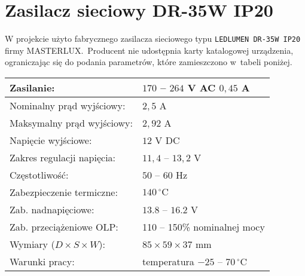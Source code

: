 \chapter{Zasilacz sieciowy DR-35W IP20}

W projekcie użyto fabrycznego zasilacza sieciowego typu \texttt{LEDLUMEN DR-35W IP20} firmy MASTERLUX.~Producent nie udostępnia karty katalogowej urządzenia, ograniczając się do podania parametrów, które zamieszczono w~tabeli poniżej.

\vspace{1cm}

\begin{centering}

\begin{tabular}{|l|l|}
  \hline
  Zasilanie: & $170$ -- $264$ V AC $0,45$ A \\
  \hline 
  Nominalny prąd wyjściowy: & $2,5$ A\\
  \hline
  Maksymalny prąd wyjściowy: & $2,92$ A \\
  \hline 
  Napięcie wyjściowe: & $12$ V DC  \\
  \hline
  Zakres regulacji napięcia: & $11,4$ -- $13,2$ V \\
  \hline
  Częstotliwość: & $50$ -- $60$ Hz \\
  \hline
  Zabezpieczenie termiczne: & $140\,^{\circ}\mathrm{C}$  \\
  \hline
  Zab. nadnapięciowe: & $13.8$ -- $16.2$ V \\
  \hline
  Zab. przeciążeniowe OLP: & 110 -- 150\% nominalnej mocy \\
  \hline
  Wymiary ($D \times S \times W$): & $ 85 \times 59 \times 37$ mm \\
  \hline
  Warunki pracy: & temperatura $-25$ -- $70\,^{\circ}\mathrm{C}$  \\
  \hline
\end{tabular}

\end{centering}

